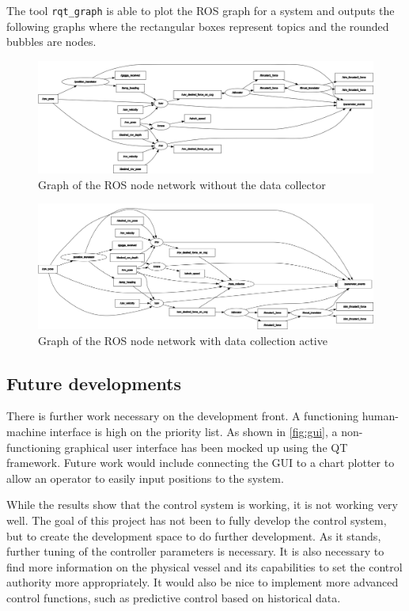 \documentclass[class=article, crop=false]{standalone}
\begin{document}
The tool \texttt{rqt\_graph} is able to plot the ROS graph for a system and outputs the following graphs where the rectangular boxes represent topics and the rounded bubbles are nodes.
\begin{figure}
    \centering
    \includegraphics[width=\textheight]{rosgraph-nodata}
    \caption{Graph of the ROS node network without the data collector}
\end{figure}

\begin{figure}
    \centering
    \includegraphics[width=\textheight]{rosgraph-data}
    \caption{Graph of the ROS node network with data collection active}
\end{figure}

\subsection{Future developments}
There is further work necessary on the development front. A functioning human-machine interface is high on the priority list. As shown in \cref{fig:gui}, a non-functioning graphical user interface has been mocked up using the QT framework. Future work would include connecting the GUI to a chart plotter to allow an operator to easily input positions to the system.

While the results show that the control system is working, it is not working very well. The goal of this project has not been to fully develop the control system, but to create the development space to do further development. As it stands, further tuning of the controller parameters is necessary. It is also necessary to find more information on the physical vessel and its capabilities to set the control authority more appropriately. It would also be nice to implement more advanced control functions, such as predictive control based on historical data.
\end{document}
